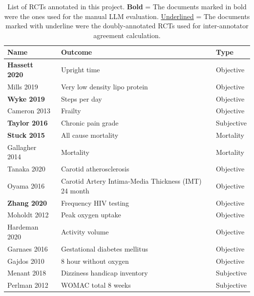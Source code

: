 \documentclass[sn-mathphys,Numbered]{sn-jnl}%
\begin{document}
\begin{longtable}{|p{4.2cm}|p{5.2cm}|p{1.9cm}|}
\caption{List of RCTs annotated in this project. \textbf{Bold} = The documents marked in bold were the ones used for the manual LLM evaluation. \underline{Underlined} = The documents marked with underline were the doubly-annotated RCTs used for inter-annotator agreement calculation.}\label{tab1} \\
\hline
\textbf{Name} & \textbf{Outcome} & \textbf{Type} \\
\hline
\endhead %
\hline
\textbf{Hassett 2020}~\cite{hassett2020digitally} & Upright time & Objective \\
\hline
Mills 2019~\cite{mills2019effect} & Very low density lipo protein & Objective \\
\hline
\textbf{Wyke 2019}~\cite{wyke2019effect} & Steps per day & Objective \\
\hline
Cameron 2013~\cite{cameron2013multifactorial} & Frailty & Objective \\
\hline
\textbf{Taylor 2016}~\cite{taylor2016novel} & Chronic pain grade & Subjective \\
\hline
\textbf{Stuck 2015}~\cite{stuck2015effect} & All cause mortality & Mortality \\
\hline
Gallagher 2014~\cite{gallagher2014long} & Mortality & Mortality \\
\hline
Tanaka 2020~\cite{tanaka2020febuxostat} & Carotid atherosclerosis & Objective \\
\hline
Oyama 2016~\cite{oyama2016effect} & Carotid Artery Intima-Media Thickness (IMT) 24 month & Objective \\
\hline
\textbf{Zhang 2020}~\cite{zhang2020impact} & Frequency HIV testing & Objective \\
\hline
Moholdt 2012~\cite{moholdt2012home} & Peak oxygen uptake & Objective \\
\hline
Hardeman 2020~\cite{hardeman2020evaluation} & Activity volume & Objective \\
\hline
Garnaes 2016~\cite{garnaes2016exercise} & Gestational diabetes mellitus & Objective \\
\hline
Gajdos 2010~\cite{gajdos2010effectiveness} & 8 hour without oxygen & Objective \\
\hline
Menant 2018~\cite{menant2018reducing} & Dizziness handicap inventory & Subjective \\
\hline
Perlman 2012~\cite{perlman2012massage} & WOMAC total 8 weeks & Subjective \\

\end{longtable}
\end{document}
